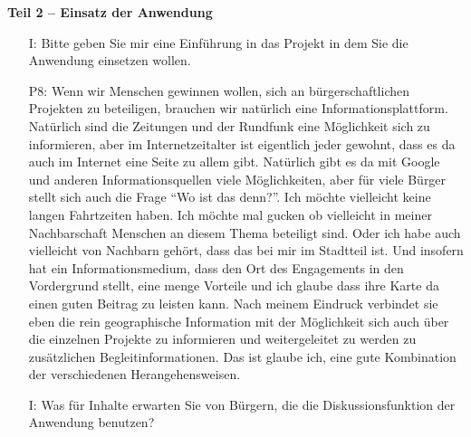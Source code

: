 \textbf{Teil 2 -- Einsatz der Anwendung}
\begin{itemize}
    \item[I:] Bitte geben Sie mir eine Einf{\"u}hrung in das Projekt in dem Sie die Anwendung einsetzen wollen.
    \item[P8:] Wenn wir Menschen gewinnen wollen, sich an b{\"u}rgerschaftlichen Projekten zu beteiligen, brauchen wir nat{\"u}rlich eine Informationsplattform. Nat{\"u}rlich sind die Zeitungen und der Rundfunk eine M{\"o}glichkeit sich zu informieren, aber im Internetzeitalter ist eigentlich jeder gewohnt, dass es da auch im Internet eine Seite zu allem gibt. Nat{\"u}rlich gibt es da mit Google und anderen Informationsquellen viele M{\"o}glichkeiten, aber f{\"u}r viele B{\"u}rger stellt sich auch die Frage "`Wo ist das denn?"'. Ich m{\"o}chte vielleicht keine langen Fahrtzeiten haben. Ich m{\"o}chte mal gucken ob vielleicht in meiner Nachbarschaft Menschen an diesem Thema beteiligt sind. Oder ich habe auch vielleicht von Nachbarn geh{\"o}rt, dass das bei mir im Stadtteil ist. Und insofern hat ein Informationsmedium, dass den Ort des Engagements in den Vordergrund stellt, eine menge Vorteile und ich glaube dass ihre Karte da einen guten Beitrag zu leisten kann. Nach meinem Eindruck verbindet sie eben die rein geographische Information mit der M{\"o}glichkeit sich auch {\"u}ber die einzelnen Projekte zu informieren und weitergeleitet zu werden zu zus{\"a}tzlichen Begleitinformationen. Das ist glaube ich, eine gute Kombination der verschiedenen Herangehensweisen.
    \item[I:] Was f{\"u}r Inhalte erwarten Sie von B{\"u}rgern, die die Diskussionsfunktion der Anwendung benutzen?

\end{itemize}
